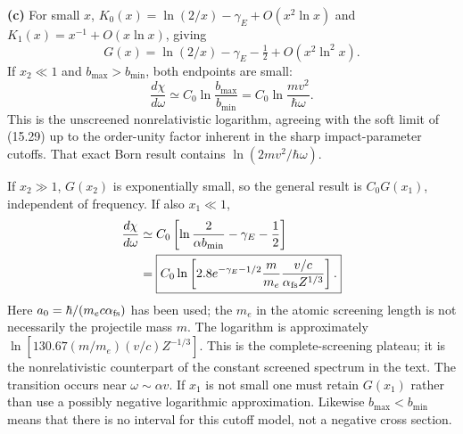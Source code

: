 \medskip\noindent\textbf{(c)} For small $x$,
$K_0(x)=\ln(2/x)-\gamma_E+O(x^2\ln x)$ and
$K_1(x)=x^{-1}+O(x\ln x)$, giving
\[
G(x)=\ln(2/x)-\gamma_E-\tfrac12+O(x^2\ln^2x).
\]
If $x_2\ll1$ and $b_{\max}>b_{\min}$, both endpoints are small:
\[
\boxed{\frac{d\chi}{d\omega}\simeq C_0\ln\frac{b_{\max}}{b_{\min}}
=C_0\ln\frac{mv^2}{\hbar\omega}.}
\]
This is the unscreened nonrelativistic logarithm, agreeing with the
soft limit of (15.29) up to the order-unity factor inherent in the
sharp impact-parameter cutoffs.  That exact Born result contains
$\ln(2mv^2/\hbar\omega)$.

If $x_2\gg1$, $G(x_2)$ is exponentially small, so the general result
is $C_0G(x_1)$, independent of frequency.  If also $x_1\ll1$,
\begin{align*}
\frac{d\chi}{d\omega}
&\simeq C_0\left[\ln\frac{2}{\alpha b_{\min}}-\gamma_E-\frac12\right]\\
&=\boxed{C_0\ln\left[
 2.8e^{-\gamma_E-1/2}\frac{m}{m_e}
 \frac{v/c}{\alpha_{\rm fs}Z^{1/3}}\right].}
\end{align*}
Here $a_0=\hbar/(m_ec\alpha_{\rm fs})$ has been used; the $m_e$
in the atomic screening length is not necessarily the projectile
mass $m$.  The logarithm is approximately
$\ln[130.67(m/m_e)(v/c)Z^{-1/3}]$.
This is the complete-screening plateau; it is the nonrelativistic
counterpart of the constant screened spectrum in the text.
The transition occurs near $\omega\sim\alpha v$.  If $x_1$ is not
small one must retain $G(x_1)$ rather than use a possibly negative
logarithmic approximation.  Likewise $b_{\max}<b_{\min}$ means that
there is no interval for this cutoff model, not a negative cross section.

